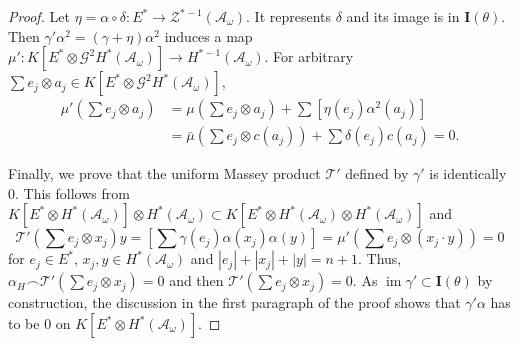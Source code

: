 \documentclass[10pt,a4paper]{amsart}
\DeclareMathOperator{\im}{im}
\begin{document}
\begin{proof}
Let $\eta=\alpha\circ\delta:E^*\to \mathcal{Z}^{*-1}(\mathcal{A_{\omega}})$. It represents $\delta$ and its image is in $\mathbf{I}(\theta)$. Then $\gamma'\alpha^2=(\gamma+\eta)\alpha^2$ induces a map $\mu':K[E^*\otimes \mathcal{G}^2H^*(\mathcal{A}_{\omega})]\to H^{*-1}(\mathcal{A}_{\omega})$. For arbitrary $\sum e_j\otimes a_j\in K[E^*\otimes \mathcal{G}^2H^*(\mathcal{A}_{\omega})]$,
\begin{align*}
\mu'\left(\sum e_j\otimes a_j\right) &= \mu\left(\sum e_j\otimes a_j\right)+\sum [\eta(e_j)\alpha^2(a_j)] \\
&= \bar{\mu}\left(\sum e_j\otimes c(a_j)\right)+\sum\delta(e_j)c(a_j) = 0.
\end{align*}

Finally, we prove that the uniform Massey product $\mathcal{T}'$ defined by $\gamma'$ is identically 0. This follows from $K[E^*\otimes H^*(\mathcal{A}_{\omega})]\otimes H^*(\mathcal{A}_{\omega})\subset K[E^*\otimes H^*(\mathcal{A}_{\omega})\otimes H^*(\mathcal{A}_{\omega})]$ and
$$
\mathcal{T'}\left(\sum e_j\otimes x_j\right) y=\left[\sum\gamma(e_j)\alpha(x_j)\alpha(y)\right]=\mu'\left(\sum e_j\otimes (x_j\cdot y)\right)=0
$$
for $e_j\in E^*$, $x_j,y\in H^*(\mathcal{A}_{\omega})$ and $|e_j|+|x_j|+|y|=n+1$. Thus, $\alpha_H\frown \mathcal{T'}\left(\sum e_j\otimes x_j\right)=0$ and then $\mathcal{T'}\left(\sum e_j\otimes x_j\right)=0$. As $\im\gamma'\subset\mathbf{I}(\theta)$ by construction, the discussion in the first paragraph of the proof shows that $\gamma'\alpha$ has to be 0 on $K[E^*\otimes H^*(\mathcal{A}_{\omega})]$. 
\end{proof}
\end{document}
